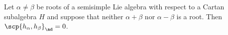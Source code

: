 Let $\alpha\neq\beta$ be roots of a semisimple Lie algebra with respect to a Cartan subalgebra $H$
and suppose that neither $\alpha + \beta$ nor $\alpha - \beta$ is a root. Then
$\scp{h_\alpha, h_\beta}_{\ad} = 0$.
